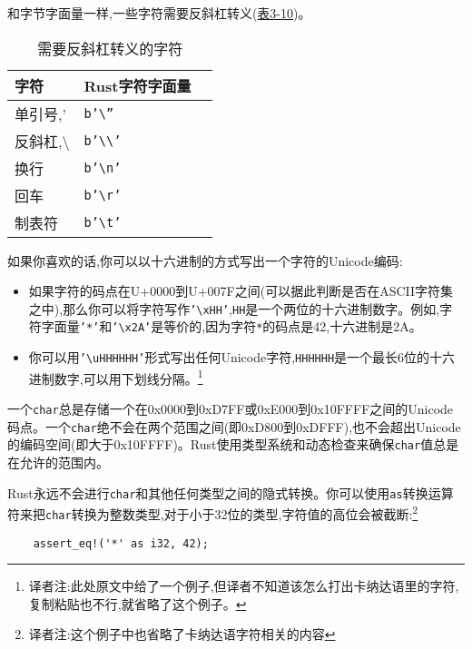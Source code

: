 和字节字面量一样,一些字符需要反斜杠转义(\hyperref[t3-10]{表3-10})。
\begin{table}[htbp]
    \centering
    \caption{需要反斜杠转义的字符}
    \label{t3-10}
    \begin{tabular}{lll}
        \hline
        \textbf{字符}   &   \textbf{Rust字符字面量} \\
        \hline
        单引号,'   &   \texttt{b'\textbackslash''} \\
        \rowcolor{tablecolor}
        反斜杠,\textbackslash &    \texttt{b'\textbackslash\textbackslash'} \\
        换行        &    \texttt{b'\textbackslash n'} \\
        \rowcolor{tablecolor}
        回车        &   \texttt{b'\textbackslash r'} \\
        制表符      &   \texttt{b'\textbackslash t'} \\
    \end{tabular}
\end{table}

如果你喜欢的话,你可以以十六进制的方式写出一个字符的Unicode编码:
\begin{itemize}
    \item 如果字符的码点在U+0000到U+007F之间(可以据此判断是否在ASCII字符集之中),那么你可以将字符写作\texttt{'\textbackslash xHH'},\texttt{HH}是一个两位的十六进制数字。例如,字符字面量\texttt{'*'}和\texttt{'\textbackslash x2A'}是等价的,因为字符\texttt{*}的码点是42,十六进制是2A。
    \item 你可以用\texttt{'\textbackslash u{HHHHHH}'}形式写出任何Unicode字符,\texttt{HHHHHH}是一个最长6位的十六进制数字,可以用下划线分隔。\footnote{译者注:此处原文中给了一个例子,但译者不知道该怎么打出卡纳达语里的字符,复制粘贴也不行,就省略了这个例子。}
\end{itemize}

一个\texttt{char}总是存储一个在0x0000到0xD7FF或0xE000到0x10FFFF之间的Unicode码点。一个\texttt{char}绝不会在两个范围之间(即0xD800到0xDFFF),也不会超出Unicode的编码空间(即大于0x10FFFF)。Rust使用类型系统和动态检查来确保\texttt{char}值总是在允许的范围内。

Rust永远不会进行\texttt{char}和其他任何类型之间的隐式转换。你可以使用\texttt{as}转换运算符来把\texttt{char}转换为整数类型,对于小于32位的类型,字符值的高位会被截断:\footnote{译者注:这个例子中也省略了卡纳达语字符相关的内容}
\begin{verbatim}
    assert_eq!('*' as i32, 42);
\end{verbatim}

